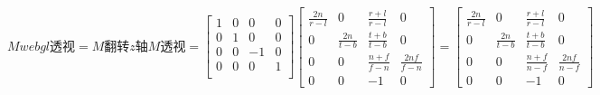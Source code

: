 $$
Mwebgl透视= M翻转z轴M透视=
\begin{bmatrix}
  1 & 0 & 0 & 0 \\
  0 & 1 & 0 & 0 \\
  0 & 0 & -1 & 0 \\
  0 & 0 & 0 & 1 \\
\end{bmatrix}
\begin{bmatrix}
  \frac{2n}{r-l} & 0 & \frac{r+l}{r-l} & 0 \\
  0 & \frac{2n}{t-b} & \frac{t+b}{t-b} & 0 \\
  0 & 0 & \frac{n + f}{f-n} & \frac{2nf}{f-n} \\
  0 & 0 & -1 & 0
\end{bmatrix}
=
\begin{bmatrix}
  \frac{2n}{r-l} & 0 & \frac{r+l}{r-l} & 0 \\
  0 & \frac{2n}{t-b} & \frac{t+b}{t-b} & 0 \\
  0 & 0 & \frac{n + f}{n-f} & \frac{2nf}{n-f} \\
  0 & 0 & -1 & 0
\end{bmatrix}
$$